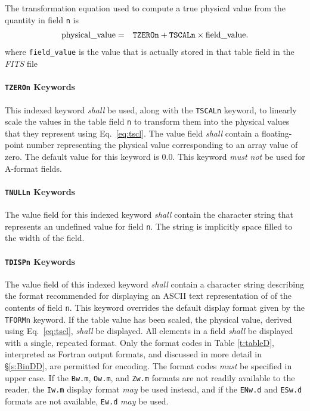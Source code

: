 \documentclass[11pt,makeidx]{book}     %
\begin{document}
 The transformation equation used to compute a true
 physical value from the quantity in field {\tt n} is
\begin{eqnarray}                                      
   \mbox{physical\_value} & = & \mbox{{\tt TZEROn}} + \mbox{{\tt TSCALn}}
                               \times \mbox{field\_value}. \label{eq:tscl}
\end{eqnarray}
\noindent
where {\tt field\_value} is the value that is actually stored in that table field 
in the {\em FITS\/} file 

   \paragraph{{\tt TZEROn} Keywords}
 This indexed keyword {\em shall} be used, along with the {\tt TSCALn}
 keyword, to linearly scale the values in the table field {\tt n}
 to transform them
 into the physical  values that they
 represent using Eq.\ \ref{eq:tscl}. The value field {\em shall}
 contain a floating-point number representing the physical value
 corresponding to an array value of zero.  The default value for
 this  keyword is 0.0.  This keyword {\em must not} 
 be used for A-format fields.

   \paragraph{{\tt TNULLn} Keywords}
 The value field for this indexed keyword {\em shall} contain 
 the character
 string that represents 
 an undefined value for field {\tt n}. 
 The string is implicitly space filled to the width of the field.
 
   \paragraph{{\tt TDISPn} Keywords}  The value field of this
 indexed keyword {\em shall} contain a character string
 describing the format recommended for displaying an ASCII text
 representation of of the contents
 of field {\tt n}.  This keyword overrides the default display format
 given by the {\tt TFORMn} keyword. 
 If the table value has been scaled, the
 physical value, derived using Eq.\ \ref{eq:tscl}, {\em shall} be
 displayed.  All elements in a field                                         
 {\em shall} be displayed with a single, repeated format.  Only the format codes in 
 Table \ref{t:tableD}, interpreted as Fortran \cite{iso04} 
 output formats, and
 discussed in more detail in \S\ref{s:BinDD}, 
 are permitted for encoding. The format codes {\em must} be specified in upper case.
 If the {\tt Bw.m}, {\tt Ow.m}, and {\tt Zw.m} formats are 
 not readily available to the reader, the {\tt Iw.m} display format {\em may} be used 
 instead, and if the {\tt ENw.d} and {\tt ESw.d} formats are not available, 
 {\tt Ew.d} {\em may} 
 be used.
\end{document}
